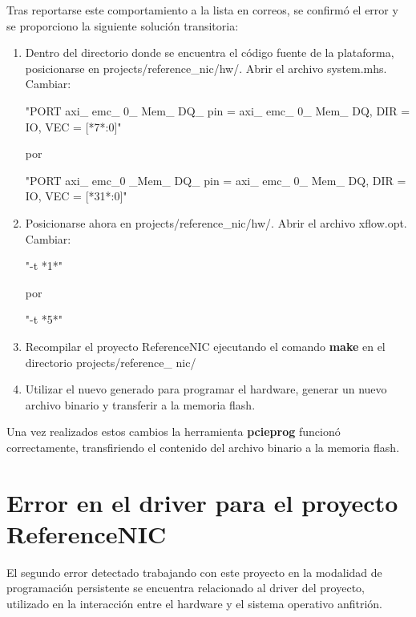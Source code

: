 Tras reportarse este comportamiento a la lista en correos\citep{NetFPGABetaMailing}, se confirm\'o el error y se proporciono la siguiente solución transitoria:

\begin{enumerate}
\item Dentro del directorio donde se encuentra el c\'odigo fuente de la plataforma, posicionarse en 
	  projects/reference\_nic/hw/. Abrir el archivo system.mhs.\\
	  Cambiar:
\begin{center}
	"PORT axi\_ emc\_ 0\_ Mem\_ DQ\_ pin = axi\_ emc\_ 0\_ Mem\_ DQ, DIR = IO, VEC = [*7*:0]"
\end{center}
por
\begin{center}
"PORT axi\_ emc\_0 \_Mem\_ DQ\_ pin = axi\_ emc\_ 0\_ Mem\_ DQ, DIR = IO, VEC = [*31*:0]"
\end{center}

\item Posicionarse ahora en projects/reference\_nic/hw/. Abrir el archivo xflow.opt.\\
	  Cambiar:
\begin{center}
"-t *1*"
\end{center}
por
\begin{center}
"-t *5*"
\end{center}

\item Recompilar el proyecto ReferenceNIC ejecutando el comando \textbf{make} en el directorio projects/reference\_ nic/

\item Utilizar el nuevo  generado para programar el hardware, generar un nuevo archivo binario y transferir a la memoria flash.
\end{enumerate}

Una vez realizados estos cambios la herramienta \textbf{pcieprog} funcion\'o correctamente, transfiriendo el contenido del archivo binario a la memoria flash.
 
\section{Error en el driver para el proyecto ReferenceNIC}
El segundo error detectado trabajando con este proyecto en la modalidad de programaci\'on persistente  se encuentra relacionado al driver del proyecto, utilizado en la interacción entre el hardware y el sistema operativo anfitrión.\\

